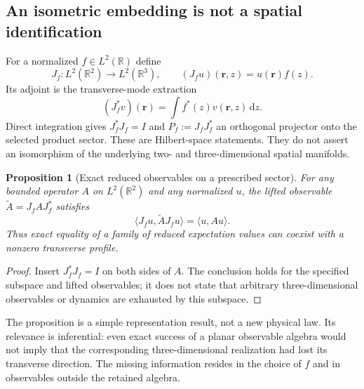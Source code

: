 \documentclass[11pt,a4paper]{article}
\newtheorem{proposition}{Proposition}[section]
\theoremstyle{definition}
\theoremstyle{remark}
\newcommand{\dd}{\mathrm{d}}
\newcommand{\R}{\mathbb{R}}
\begin{document}
\subsection{An isometric embedding is not a spatial identification}
For a normalized $f\in L^2(\R)$ define
\begin{equation}
 J_f:L^2(\R^2)\longrightarrow L^2(\R^3),
 \qquad (J_f u)(\boldsymbol r,z)=u(\boldsymbol r)f(z).
 \label{eq:isometry}
\end{equation}
Its adjoint is the transverse-mode extraction
\begin{equation}
 (J_f^*v)(\boldsymbol r)=\int f^*(z)v(\boldsymbol r,z)\,\dd z.
 \label{eq:adjoint}
\end{equation}
Direct integration gives $J_f^*J_f=I$ and $P_f:=J_fJ_f^*$ an orthogonal projector onto the selected product sector. These are Hilbert-space statements. They do not assert an isomorphism of the underlying two- and three-dimensional spatial manifolds.

\begin{proposition}[Exact reduced observables on a prescribed sector]
For any bounded operator $A$ on $L^2(\R^2)$ and any normalized $u$, the lifted observable $\widetilde A=J_fAJ_f^*$ satisfies
\begin{equation}
 \langle J_fu,\widetilde A J_fu\rangle
 =\langle u,Au\rangle.
 \label{eq:expectation_lift}
\end{equation}
Thus exact equality of a family of reduced expectation values can coexist with a nonzero transverse profile.
\end{proposition}
\begin{proof}
Insert $J_f^*J_f=I$ on both sides of $A$. The conclusion holds for the specified subspace and lifted observables; it does not state that arbitrary three-dimensional observables or dynamics are exhausted by this subspace.
\end{proof}

The proposition is a simple representation result, not a new physical law. Its relevance is inferential: even exact success of a planar observable algebra would not imply that the corresponding three-dimensional realization had lost its transverse direction. The missing information resides in the choice of $f$ and in observables outside the retained algebra.
\end{document}
